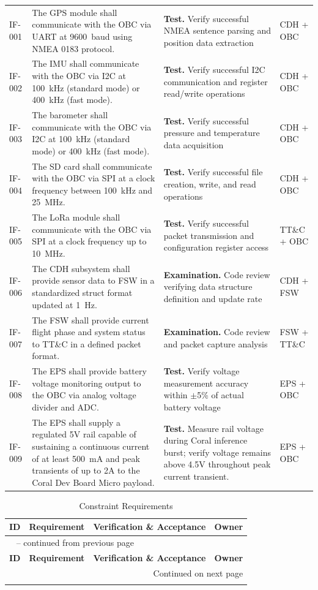 \begin{landscape}
\begin{longtable}{p{1.4cm}p{8.2cm}p{10.2cm}p{1.9cm}}
IF-001 & The GPS module shall communicate with the OBC via UART at 9600~baud using NMEA 0183 protocol. & \textbf{Test.} Verify successful NMEA sentence parsing and position data extraction & CDH + OBC \\
IF-002 & The IMU shall communicate with the OBC via I2C at 100~kHz (standard mode) or 400~kHz (fast mode). & \textbf{Test.} Verify successful I2C communication and register read/write operations & CDH + OBC \\
IF-003 & The barometer shall communicate with the OBC via I2C at 100~kHz (standard mode) or 400~kHz (fast mode). & \textbf{Test.} Verify successful pressure and temperature data acquisition & CDH + OBC \\
IF-004 & The SD card shall communicate with the OBC via SPI at a clock frequency between 100~kHz and 25~MHz. & \textbf{Test.} Verify successful file creation, write, and read operations & CDH + OBC \\
IF-005 & The LoRa module shall communicate with the OBC via SPI at a clock frequency up to 10~MHz. & \textbf{Test.} Verify successful packet transmission and configuration register access & TT\&C + OBC \\
IF-006 & The CDH subsystem shall provide sensor data to FSW in a standardized struct format updated at 1~Hz. & \textbf{Examination.} Code review verifying data structure definition and update rate & CDH + FSW \\
IF-007 & The FSW shall provide current flight phase and system status to TT\&C in a defined packet format. & \textbf{Examination.} Code review and packet capture analysis & FSW + TT\&C \\
IF-008 & The EPS shall provide battery voltage monitoring output to the OBC via analog voltage divider and ADC. & \textbf{Test.} Verify voltage measurement accuracy within $\pm$5\% of actual battery voltage & EPS + OBC \\
IF-009 & The EPS shall supply a regulated 5V rail capable of sustaining a continuous current of at least 500~mA and peak transients of up to 2A to the Coral Dev Board Micro payload. & \textbf{Test.} Measure rail voltage during Coral inference burst; verify voltage remains above 4.5V throughout peak current transient. & EPS + OBC \\
\end{longtable}

\begin{longtable}{p{1.4cm}p{8.2cm}p{10.2cm}p{1.9cm}}
\caption{Constraint Requirements}
\label{tab:req-constraint} \\
\toprule
\textbf{ID} & \textbf{Requirement} & \textbf{Verification \& Acceptance} & \textbf{Owner} \\
\midrule
\endfirsthead
\multicolumn{4}{l}{\tablename\ \thetable{} -- continued from previous page} \\
\toprule
\textbf{ID} & \textbf{Requirement} & \textbf{Verification \& Acceptance} & \textbf{Owner} \\
\midrule
\endhead
\midrule
\multicolumn{4}{r}{Continued on next page} \\
\endfoot
\bottomrule
\endlastfoot


\end{longtable}
\end{landscape}
